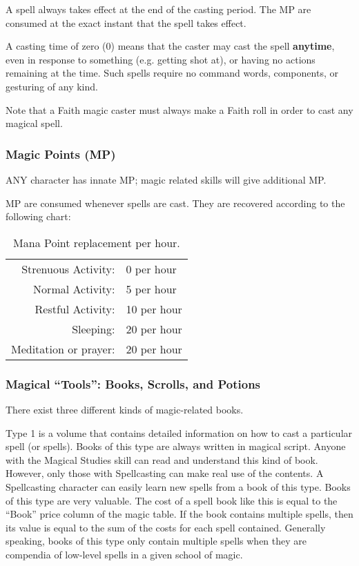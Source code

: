 A spell always takes effect at the end of the casting period.  The MP
are consumed at the exact instant that the spell takes effect.

A casting time of zero (0) means that the caster may cast the spell
\textbf{anytime}, even in response to something (e.g. getting shot
at), or having no actions remaining at the time.  Such spells require
no command words, components, or gesturing of any kind.

Note that a Faith magic caster must always make a Faith roll in order
to cast any magical spell.

\subsubsection{Magic Points (MP)}

ANY character has innate MP; magic related skills will give additional MP.

MP are consumed whenever spells are cast.  They are recovered
according to the following chart:

\begin{table}[htb]
\begin{center}
\begin{tabular}{rl}
Strenuous Activity: & 0 per hour \\
Normal Activity: & 5 per hour \\
Restful Activity: & 10 per hour \\
Sleeping: & 20 per hour \\
Meditation or prayer: & 20 per hour \\
\end{tabular}
\caption{Mana Point replacement per hour.}
\end{center}
\end{table}

\subsubsection{Magical ``Tools'': Books, Scrolls, and Potions}

There exist three different kinds of magic-related books.

Type 1 is a volume that contains detailed information on how to cast a
particular spell (or spells).  Books of this type are always written
in magical script.  Anyone with the Magical Studies skill can read and
understand this kind of book.  However, only those with Spellcasting
can make real use of the contents.  A Spellcasting character can
easily learn new spells from a book of this type.  Books of this type
are very valuable.  The cost of a spell book like this is equal to the
``Book'' price column of the magic table.  If the book contains
multiple spells, then its value is equal to the sum of the costs for
each spell contained.  Generally speaking, books of this type only
contain multiple spells when they are compendia of low-level spells in
a given school of magic.

